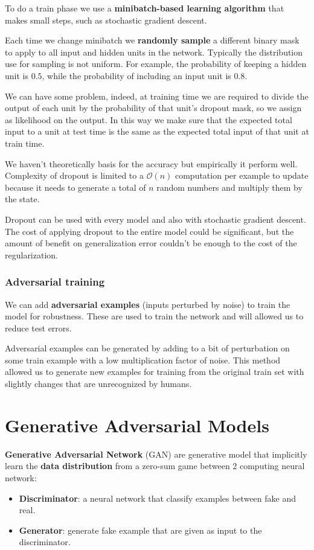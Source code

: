 To do a train phase we use a \textbf{minibatch-based learning algorithm} that
makes small steps, such as stochastic gradient descent.

Each time we change minibatch we \textbf{randomly sample} a different binary mask
to apply to all input and hidden units in the network. Typically the distribution
use for sampling is not uniform. For example, the probability of keeping a hidden
unit is $0.5$, while the probability of including an input unit is $0.8$.

We can have some problem, indeed, at training time we are required to divide the
output of each unit by the probability of that unit's dropout mask, so we assign
as likelihood on the output. In this way we make sure that the expected total
input to a unit at test time is the same as the expected total input of that unit
at train time.

We haven't theoretically basis for the accuracy but empirically it perform well.
Complexity of dropout is limited to a $\mathcal{O}(n)$ computation per example
to update because it needs to generate a total of $n$ random numbers and multiply
them by the state.

Dropout can be used with every model and also with stochastic gradient descent.
The cost of applying dropout to the entire model could be significant, but the
amount of benefit on generalization error couldn't be enough to the cost of the
regularization.
\subsubsection{Adversarial training}
We can add \textbf{adversarial examples} (inputs perturbed by noise) to train the
model for robustness. These are used to train the network and will allowed us to
reduce test errors.

Adversarial examples can be generated by adding to a bit of perturbation on some
train example with a low multiplication factor of noise. This method allowed us
to generate new examples for training from the original train set with slightly
changes that are unrecognized by humans.
\section{Generative Adversarial Models}
\textbf{Generative Adversarial Network} (GAN) are generative model that
implicitly learn the \textbf{data distribution} from a zero-sum game between 2
computing neural network:
\begin{itemize}
    \item \textbf{Discriminator}: a neural network that classify examples between
          fake and real.
    \item \textbf{Generator}: generate fake example that are given as input to the
          discriminator.
\end{itemize}

